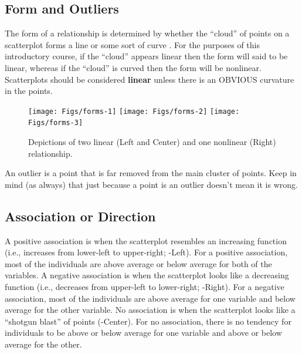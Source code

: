 \documentclass[10pt,openany]{book}\usepackage[]{graphicx}\usepackage[]{color}
\newenvironment{knitrout}{}{} %
\begin{document}
\subsection{Form and Outliers}
The form of a relationship is determined by whether the ``cloud'' of points on a scatterplot forms a line or some sort of curve . For the purposes of this introductory course, if the ``cloud'' appears linear then the form will said to be linear, whereas if the ``cloud'' is curved then the form will be nonlinear. Scatterplots should be considered \textbf{linear} unless there is an OBVIOUS curvature in the points.

\begin{knitrout}
\color{fgcolor}\begin{figure}[hbtp]

{\centering \texttt{[image: Figs/forms-1]} 
\texttt{[image: Figs/forms-2]} 
\texttt{[image: Figs/forms-3]} 

}

\caption[Depictions of two linear (Left and Center) and one nonlinear (Right) relationship]{Depictions of two linear (Left and Center) and one nonlinear (Right) relationship.}\label{fig:forms}
\end{figure}


\end{knitrout}

\vspace{12pt} %
An outlier is a point that is far removed from the main cluster of points. Keep in mind (as always) that just because a point is an outlier doesn't mean it is wrong.

\subsection{Association or Direction}
A positive association is when the scatterplot resembles an increasing function (i.e., increases from lower-left to upper-right; -Left). For a positive association, most of the individuals are above average or below average for both of the variables. A negative association is when the scatterplot looks like a decreasing function (i.e., decreases from upper-left to lower-right; -Right). For a negative association, most of the individuals are above average for one variable and below average for the other variable. No association is when the scatterplot looks like a ``shotgun blast'' of points (-Center). For no association, there is no tendency for individuals to be above or below average for one variable and above or below average for the other.
\end{document}
